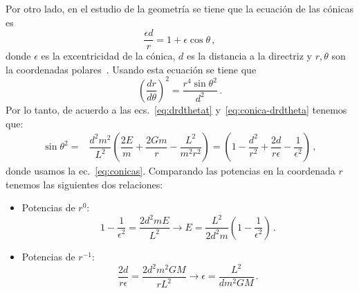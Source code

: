 Por otro lado, en el estudio de la geometría se tiene que la ecuación de las cónicas es
\begin{equation}
\label{eq:conicas}
\dfrac{\epsilon d}{r} = 1 +\epsilon\cos\theta\,,
\end{equation}
donde $\epsilon$ es la excentricidad de la cónica, $d$ es la distancia a la directriz y $r,\theta$ son la coordenadas polares~\cite{alonso1967fundamental}.
Usando esta ecuación se tiene que
\begin{equation}
\label{eq:conica-drdtheta}
\left(\dfrac{dr}{d\theta}\right)^2=\dfrac{r^4\sin\theta^2}{d^2}\,.
\end{equation}
Por lo tanto, de acuerdo a las ecs.~\eqref{eq:drdthetat} y~\eqref{eq:conica-drdtheta} tenemos que:
\begin{align}
\sin\theta^2 =& \dfrac{d^2m^2}{L^2}\left(\dfrac{2E}{m}+\dfrac{2Gm}{r}-\dfrac{L^2}{m^2r^2}\right)=\left(1-\dfrac{d^2}{r^2}+\dfrac{2d}{r\epsilon}-\dfrac{1}{\epsilon^2}\right)\,,
\end{align} 
donde usamos la ec.~\eqref{eq:conicas}. Comparando las potencias en la coordenada $r$ tenemos las siguientes dos relaciones: 
\begin{itemize}
\item Potencias de $r^0$:
\begin{equation}
\label{eq:Energia-general}
1-\dfrac{1}{\epsilon^2}=\dfrac{2d^2mE}{L^2} \to E=\dfrac{L^2}{2d^2m}\left(1-\dfrac{1}{\epsilon^2}\right)\,.
\end{equation}
\item Potencias de $r^{-1}$:
\begin{equation}
\label{e:excentricidad}
\dfrac{2d}{r\epsilon}=\dfrac{2d^2m^2GM}{rL^2} \to \epsilon=\dfrac{L^2}{dm^2GM}\,.
\end{equation}
\end{itemize}

